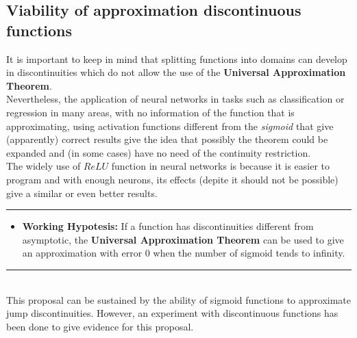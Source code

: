 \documentclass[a4paper, 11pt]{article}
\begin{document}
\subsection{Viability of approximation discontinuous functions}
It is important to keep in mind that splitting functions into domains can develop in discontinuities which do not allow the use of the \textbf{Universal Approximation Theorem}.\\
Nevertheless, the application of neural networks in tasks such as classification or regression in many areas, with no information of the function that is approximating, using activation functions different from the \textit{sigmoid} that give (apparently) correct results give the idea that possibly the theorem could be expanded and (in some cases) have no need of the continuity restriction.\\
The widely use of $ReLU$ function in neural networks is because it is easier to program and with enough neurons, its effects (depite it should not be possible) give a similar or even better results.\\
\newpage
\hspace{-1.6em}\rule{\linewidth}{0.4pt}
\begin{itemize}
    \item \textbf{Working Hypotesis:} If a function has discontinuities different from asymptotic, the \textbf{Universal Approximation Theorem} can be used to give an approximation with error 0 when the number of sigmoid tends to infinity.
\end{itemize}
\rule{\linewidth}{0.4pt}\\ \vspace{0.5em}
This proposal can be sustained by the ability of sigmoid functions to approximate jump discontinuities. However, an experiment with discontinuous functions has been done to give evidence for this proposal.
\end{document}
